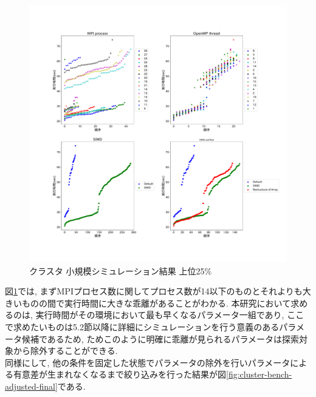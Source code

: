 \begin{figure}[htb]
 \begin{center}
    \includegraphics[width=1.2\textwidth]{./images/cluster-bench-top25.pdf}
    \caption{クラスタ 小規模シミュレーション結果 上位25\%}
    \label{fig:cluster-bench-top25}
 \end{center}
\end{figure}
図\ref{fig:cluster-bench-top25}では, まずMPIプロセス数に関してプロセス数が14以下のものとそれよりも大きいものの間で実行時間に大きな乖離があることがわかる.
本研究において求めるのは, 実行時間がその環境において最も早くなるパラメータ一組であり,
ここで求めたいものは5.2節以降に詳細にシミュレーションを行う意義のあるパラメータ候補であるため,
ためこのように明確に乖離が見られるパラメータは探索対象から除外することができる.\\
同様にして, 他の条件を固定した状態でパラメータの除外を行いパラメータによる有意差が生まれなくなるまで絞り込みを行った結果が図\ref{fig:cluster-bench-adjusted-final}である.\\
